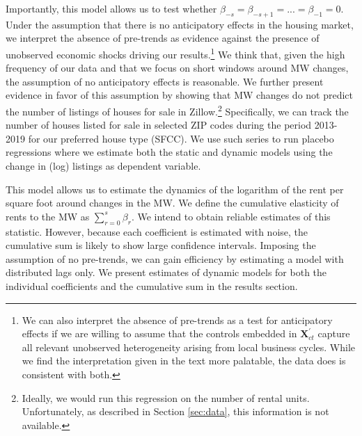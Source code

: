 Importantly, this model allows us to test whether $\beta_{-s} = \beta_{-s+1} = ... = \beta_{-1} 
= 0$. Under the assumption that there is no anticipatory effects in the housing market, we 
interpret the absence of pre-trends as evidence against the presence of unobserved economic 
shocks driving our results.\footnote{We can also interpret the absence of pre-trends as a test 
	for anticipatory effects if we are willing to assume that the controls embedded in 
	$\mathbf{X}^{'}_{ct}$ capture all relevant unobserved heterogeneity arising from local 
	business cycles. While we find the interpretation given in the text more palatable, the 
	data does is consistent with both.}
We think that, given the high frequency of our data and that we focus on short windows around MW 
changes, the assumption of no anticipatory effects is reasonable. We further present evidence in 
favor of this assumption by showing that MW changes do not predict the number of listings of 
houses for sale in Zillow.\footnote{Ideally, we would run this regression on the number of rental 
	units. Unfortunately, as described in Section \ref{sec:data}, this information is not available.}
Specifically, we can track the number of houses listed for sale in selected ZIP codes during the 
period 2013-2019 for our preferred house type (SFCC). We use such series to run placebo 
regressions where we estimate both the static and dynamic models using the change in (log) 
listings as dependent variable. %

This model allows us to estimate the dynamics of the logarithm of the rent per square foot around 
changes in the MW. We define the cumulative elasticity of rents to the MW as $\sum_{r=0}^s \beta_r$. 
We intend to obtain reliable estimates of this statistic. However, because each coefficient is 
estimated with noise, the cumulative sum is likely to show large confidence intervals. Imposing 
the assumption of no pre-trends, we can gain efficiency by estimating a model with distributed 
lags only. We present estimates of dynamic models for both the individual coefficients and the 
cumulative sum in the results section.


